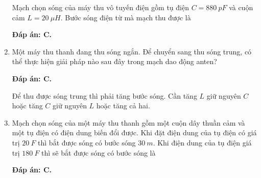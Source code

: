 \begin{enumerate}[label=\bfseries Câu \arabic*:]
	{Mạch chọn sóng của máy thu vô tuyến điện gồm tụ điện $C = \SI{880}{pF}$ và cuộn cảm $L = \SI{20}{\mu H}$. Bước sóng điện từ mà mạch thu được là
		
	}
	
	\hideall
	{		\textbf{Đáp án: C.}
		
	
	}
		\item {} 
	
	{Một máy thu thanh đang thu sóng ngắn. Để chuyển sang thu sóng trung, có thể thực hiện giải pháp nào sau đây trong mạch dao động anten?
	}
	
	\hideall
	{		\textbf{Đáp án: C.}
		
		Để thu được sóng trung thì phải tăng bước sóng. Cần tăng $L$ giữ nguyên $C$ hoặc tăng $C$ giữ nguyên $L$ hoặc tăng cả hai.
	}
		\item {} 
	
	{Mạch chọn sóng của một máy thu thanh gồm một cuộn dây thuần cảm và một tụ điện có điện dung biến đổi được. Khi đặt điện dung của tụ điện có giá trị $\SI{20}{F}$ thì bắt được sóng có bước sóng $\SI{30}{m}$. Khi điện dung của tụ điện giá trị $\SI{180}{F}$ thì sẽ bắt được sóng có bước sóng là
		
	}
	
	\hideall
	{		\textbf{Đáp án: C.}
		
}
\end{enumerate}
